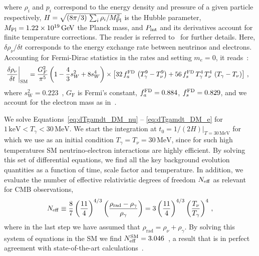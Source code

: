 \documentclass[notitlepage,letterpaper,natbib,aps,prd,onecolumn,amsmath,amsfonts,nofootinbib,preprintnumbers,superscriptaddress,secnumarabic,groupedaddress]{revtex4-1}
\begin{document}
where $\rho_i$ and $p_i$ correspond to the energy density and pressure of a given particle respectively, $H = \sqrt{(8\pi/3)\,\sum_i \rho_i/M_{\rm Pl}^2}$ is the Hubble parameter, $M_{\rm Pl} = 1.22\times 10^{19}\,\text{GeV}$ the Planck mass, and $P_{\rm int}$ and its derivatives account for finite temperature corrections. The reader is referred to~\cite{Escudero:2018mvt} for further details. Here, $\delta \rho_{\nu} /\delta t$ corresponds to the energy exchange rate between neutrinos and electrons. Accounting for Fermi-Dirac statistics in the rates and setting $m_e = 0$, it reads~\cite{Escudero:2019new}:
\begin{align}\label{eq:energyrates_nu_SM}
& \left. \frac{\delta \rho_{\nu}}{\delta t}  \right|_{\rm SM} = \frac{G_F^2}{\pi^5} \left( 1 - \frac{4}{3} s_W^2 + 8 s_W^4 \right) \times  \left[ 32 \, f_a^{\rm FD} \,  \left( T_\gamma^9-T_{\nu}^9  \right) +  56 \,f_s^{\rm FD} \,   T_\gamma^4 \, T_{\nu}^4 \, \left( T_\gamma - T_{\nu}\right)\right] \,,
\end{align}
where $s_\mathrm{W}^2 = 0.223$~\cite{pdg}, $G_\mathrm{F}$ is Fermi's constant, $f_a^{\rm FD} = 0.884$, $f_s^{\rm FD} = 0.829$, and we account for the electron mass as in~\cite{Escudero:2019new}. 

We solve Equations~\eqref{eq:dTgamdt_DM_nu} -- \eqref{eq:dTgamdt_DM_e} for $1\,\text{keV} < T_\gamma < 30\,\text{MeV}$. We start the integration at $t_0 = 1/(2 H)|_{T = 30\,\text{MeV}}$ for which we use as an initial condition $T_\gamma = T_\nu = 30 \,\text{MeV}$, since for such high temperatures SM neutrino-electron interactions are highly efficient. By solving this set of differential equations, we find all the key background evolution quantities as a function of time, scale factor and temperature. In addition, we evaluate the number of effective relativistic degrees of freedom $N_{\rm eff}$ as relevant for CMB observations,
\begin{align}\label{eq:Neff}
N_{\rm eff} \equiv \frac{8}{7}\left(\frac{11}{4} \right)^{4/3} \left( \frac{\rho_\text{rad}-\rho_\gamma}{\rho_\gamma}\right) = 3 \left(\frac{11}{4} \right)^{4/3} \left(\frac{T_\nu}{T_\gamma}\right)^4 \, ,
\end{align} 
where in the last step we have assumed that $\rho_\text{rad} = \rho_\nu + \rho_\gamma$. By solving this system of equations in the SM we find $N_{\rm eff}^{\rm SM} = 3.046$~\cite{Escudero:2019new}, a result that is in perfect agreement with state-of-the-art calculations~\cite{Mangano:2005cc,deSalas:2016ztq}. 
\end{document}
